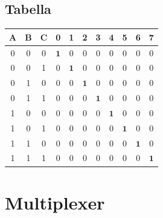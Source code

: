 \begin{minipage}[t]{0.41\textwidth}
\end{minipage}

\subsection{Tabella}
{
    \Large

    \begin{center}
        \begin{tabular}{ccc|cccccccc}
            \textbf{A} & \textbf{B} & \textbf{C} & \textbf{0} & \textbf{1} & \textbf{2} & \textbf{3} & \textbf{4} & \textbf{5} & \textbf{6} & \textbf{7} \\
            \hline
            0 & 0 & 0 & $\mathbf{1}$ & 0 & 0 & 0 & 0 & 0 & 0 & 0 \\
            0 & 0 & 1 & 0 & $\mathbf{1}$ & 0 & 0 & 0 & 0 & 0 & 0 \\
            0 & 1 & 0 & 0 & 0 & $\mathbf{1}$ & 0 & 0 & 0 & 0 & 0 \\
            0 & 1 & 1 & 0 & 0 & 0 & $\mathbf{1}$ & 0 & 0 & 0 & 0 \\
            1 & 0 & 0 & 0 & 0 & 0 & 0 & $\mathbf{1}$ & 0 & 0 & 0 \\
            1 & 0 & 1 & 0 & 0 & 0 & 0 & 0 & $\mathbf{1}$ & 0 & 0 \\
            1 & 1 & 0 & 0 & 0 & 0 & 0 & 0 & 0 & $\mathbf{1}$ & 0 \\
            1 & 1 & 1 & 0 & 0 & 0 & 0 & 0 & 0 & 0 & $\mathbf{1}$ \\
        \end{tabular}
    \end{center}
}

\section{Multiplexer}
